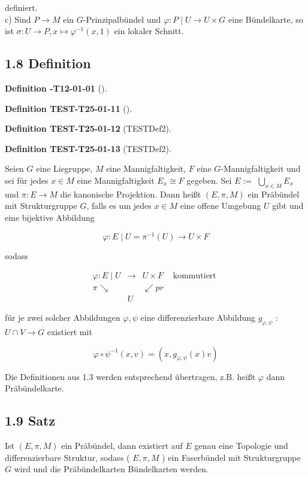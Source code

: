 \documentclass[10pt, letterpaper]{article}
\newcommand{\CustomHeading}[3]{%
  \par\medskip\noindent%
  \textbf{#1 #2} \textnormal{(#3)}.\enskip%
}
\newenvironment{DEF}[2]{\begin{unitbox}\CustomHeading{Definition}{#1}{#2}}{\end{unitbox}}
\begin{document}
definiert.\\
c) Sind $P \rightarrow M$ ein $G$-Prinzipalbündel und $\varphi: P \mid U \rightarrow U \times G$ eine Bündelkarte, so ist $\sigma: U \rightarrow P, x \mapsto \varphi^{-1}(x, 1)$ ein lokaler Schnitt.

\subsection*{1.8 Definition}
\begin{DEF}{-T12-01-01}{}
\begin{DEF}{TEST-T25-01-11}{}
\begin{DEF}{TEST-T25-01-12}{TESTDef2}
\begin{DEF}{TEST-T25-01-13}{TESTDef2}
Seien $G$ eine Liegruppe, $M$ eine Mannigfaltigkeit, $F$ eine $G$-Mannigfaltigkeit und sei für jedes $x \in M$ eine Mannigfaltigkeit $E_{x} \cong F$ gegeben. Sei $E:=$ $\bigcup_{x \in M} E_{x}$ und $\pi: E \rightarrow M$ die kanonische Projektion. Dann heißt $(E, \pi, M)$ ein Präbündel mit Strukturgruppe $G$, falls es um jedes $x \in M$ eine offene Umgebung $U$ gibt und eine bijektive Abbildung

$$
\varphi: E \mid U=\pi^{-1}(U) \rightarrow U \times F
$$

sodass

$$
\begin{array}{rlll}
\varphi: E \mid U & \longrightarrow & U \times F & \text { kommutiert } \\
\pi \searrow & & \swarrow p r & \\
& U & &
\end{array}
$$

für je zwei solcher Abbildungen $\varphi, \psi$ eine differenzierbare Abbildung $g_{\varphi, \psi}$ : $U \cap V \rightarrow G$ existiert mit

$$
\varphi \circ \psi^{-1}(x, v)=\left(x, g_{\varphi, \psi}(x) v\right)
$$

Die Definitionen aus 1.3 werden entsprechend übertragen, z.B. heißt $\varphi$ dann Präbündelkarte.
\end{DEF}
\end{DEF}
\end{DEF}
\end{DEF}

\subsection*{1.9 Satz}
Ist $(E, \pi, M)$ ein Präbündel, dann existiert auf $E$ genau eine Topologie und differenzierbare Struktur, sodass ( $E, \pi, M$ ) ein Faserbündel mit Strukturgruppe $G$ wird und die Präbündelkarten Bündelkarten werden.
\end{document}
